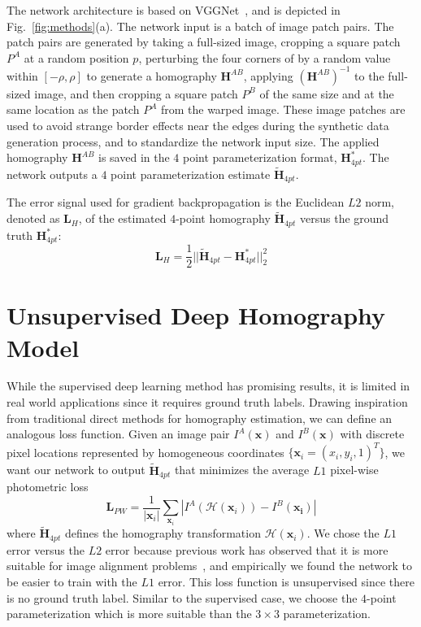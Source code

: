 \documentclass[letterpaper, 10 pt, conference]{ieeeconf}
\begin{document}
The network architecture is based on VGGNet~\cite{simonyan2014very}, and is depicted in Fig.~\ref{fig:methods}(a). The network input is a batch of image patch pairs. The patch pairs are generated by taking a full-sized image, cropping a square patch $P^A$ at a random position $p$, perturbing the four corners of by a random value within $[-\rho, \rho]$ to generate a homography $\mathbf{H}^{AB}$, applying $(\mathbf{H}^{AB})^{-1}$ to the full-sized image, and then cropping a square patch $P^B$ of the same size and at the same location as the patch $P^A$ from the warped image. These image patches are used to avoid strange border effects near the edges during the synthetic data generation process, and to standardize the network input size. The applied homography $\mathbf{H}^{AB}$ is saved in the $4$ point parameterization format, $\mathbf{H}^{*}_{4pt}$. The network outputs a  $4$ point parameterization estimate $\mathbf{\tilde{H}}_{4pt}$.

The error signal used for gradient backpropagation is the Euclidean $L2$ norm, denoted as $\mathbf{L}_H$, of the estimated $4$-point homography $ \mathbf{\tilde{H}}_{4pt}$ versus the ground truth $\mathbf{H}^{*}_{4pt}$:
\begin{equation}
\mathbf{L}_H = \frac{1}{2} || \mathbf{\tilde{H}}_{4pt}  - \mathbf{H}^{*}_{4pt} || ^2_2 
\label{eq:H_loss}
\end{equation}








 \section{Unsupervised Deep Homography Model}
\label{sec:method}
While the supervised deep learning method has promising results, it is limited in real world applications since it requires ground truth labels. Drawing inspiration from traditional direct methods for homography estimation, we can define an analogous loss function. Given an image pair $I^{A}(\mathbf{x})$ and $I^{B}(\mathbf{x})$ with discrete pixel locations represented by homogeneous coordinates $\{\mathbf{x}_{i} = (x_{i}, y_{i}, 1)^{T}\}$, we want our network to output $\mathbf{\tilde{H}}_{4pt}$ that minimizes the average $L1$ pixel-wise photometric loss
\begin{equation}
\mathbf{L}_{PW} =  \frac{1}{|\mathbf{x}_{i}|}\sum_{\mathbf{x}_{i}} | I^{A}(\mathcal{H}(\mathbf{x}_{i})) - I^{B}(\mathbf{\mathbf{x}_{i}})|
\label{eq:pwrmse_loss}
\end{equation}
where $\mathbf{\tilde{H}}_{4pt}$ defines the homography transformation $\mathcal{H}(\mathbf{x}_{i})$. We chose the $L1$ error versus the $L2$ error because previous work has observed that it is more suitable for image alignment problems~\cite{zhao2015l2}, and empirically we found the network to be easier to train with the $L1$ error. This loss function is unsupervised since there is no ground truth label. Similar to the supervised case, we choose the $4$-point parameterization which is more suitable than the $3\times 3$ parameterization. 
\end{document}
